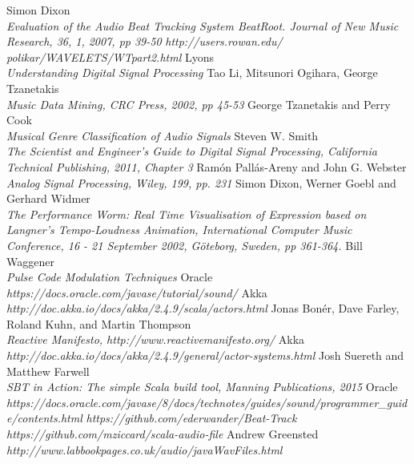 \documentclass[a4paper, 11pt]{article}
\begin{document}
\begin{thebibliography}{99}
Simon Dixon\\
\textit{Evaluation of the Audio Beat Tracking System BeatRoot. Journal of New Music Research, 36, 1, 2007, pp 39-50}
\textit{http://users.rowan.edu/ polikar/WAVELETS/WTpart2.html}
Lyons\\
\textit{Understanding Digital Signal Processing}
Tao Li, Mitsunori Ogihara, George Tzanetakis\\
\textit{Music Data Mining, CRC Press, 2002, pp 45-53}
George Tzanetakis and Perry Cook\\
\textit{Musical Genre Classification of Audio Signals}
Steven W. Smith\\
\textit{The Scientist and Engineer's Guide to Digital Signal Processing, California Technical Publishing, 2011, Chapter 3}
Ramón Pallás-Areny and John G. Webster\\
\textit{Analog Signal Processing, Wiley, 199, pp. 231}
Simon Dixon, Werner Goebl and Gerhard Widmer\\
\textit{The Performance Worm: Real Time Visualisation of Expression based on Langner’s Tempo-Loudness Animation, International Computer Music Conference, 16 - 21 September 2002, Göteborg, Sweden, pp 361-364.}
Bill Waggener\\
\textit{Pulse Code Modulation Techniques}
Oracle\\
\textit{https://docs.oracle.com/javase/tutorial/sound/}
Akka\\
\textit{http://doc.akka.io/docs/akka/2.4.9/scala/actors.html}
Jonas Bonér, Dave Farley, Roland Kuhn, and Martin Thompson\\
\textit{Reactive Manifesto, http://www.reactivemanifesto.org/}
Akka\\
\textit{http://doc.akka.io/docs/akka/2.4.9/general/actor-systems.html}
Josh Suereth and Matthew Farwell\\
\textit{SBT in Action: The simple Scala build tool, Manning Publications, 2015}
Oracle\\
\textit{https://docs.oracle.com/javase/8/docs/technotes/guides/sound/programmer\_guide/contents.html}
\textit{https://github.com/ederwander/Beat-Track}
\textit{https://github.com/mziccard/scala-audio-file}
Andrew Greensted
\textit{http://www.labbookpages.co.uk/audio/javaWavFiles.html}

\end{thebibliography}
\end{document}
